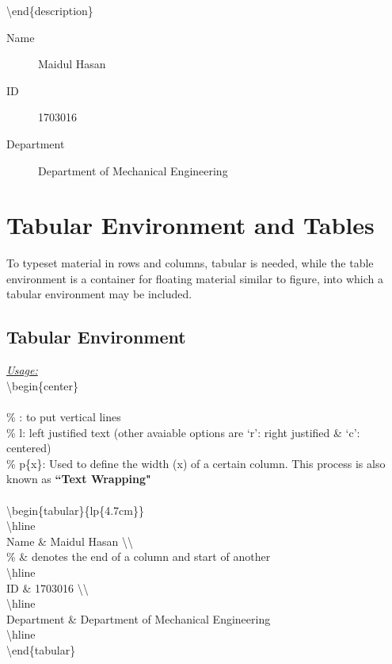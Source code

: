 \documentclass[12pt, twocolumn]{article}
\begin{document}
 \textbackslash end\{description\}

 \begin{center} \big\Downarrow \end{center}
 \begin{description}
  \item [Name] Maidul Hasan
  \item [ID] 1703016
  \item [Department] Department of Mechanical Engineering
 \end{description}


 
 \section{Tabular Environment and Tables}
 To typeset material in rows and columns, tabular is needed, while the table environment is a container for floating material similar to figure, into which a tabular environment may be included.
 
 
 \subsection{Tabular Environment}
 
  \underline{\textit{Usage:}} \\
  
 \noindent \textbackslash begin\{center\} \\ \\
 \% \textbar: to put vertical lines \\
 \% l: left justified text (other avaiable options are `r': right justified \& `c': centered) \\
 \% p\{x\}: Used to define the width (x) of a certain column. This process is also known as \textbf{``Text Wrapping"} \\ \\
 \textbackslash begin\{tabular\}\{\textbar l\textbar p\{4.7cm\}\textbar\} \\
 \hspace*{6mm} \textbackslash hline \\
  \hspace*{6mm} Name \& Maidul Hasan \textbackslash \textbackslash \\
  \% \& denotes the end of a column and start of another \\
  \hspace*{6mm} \textbackslash hline \\
  \hspace*{6mm} ID \& 1703016 \textbackslash \textbackslash \\
  \hspace*{6mm} \textbackslash hline \\
  \hspace*{6mm} Department \& Department of Mechanical Engineering \\
  \hspace*{6mm} \textbackslash hline \\
  \textbackslash end\{tabular\} \\
 
\end{document}
